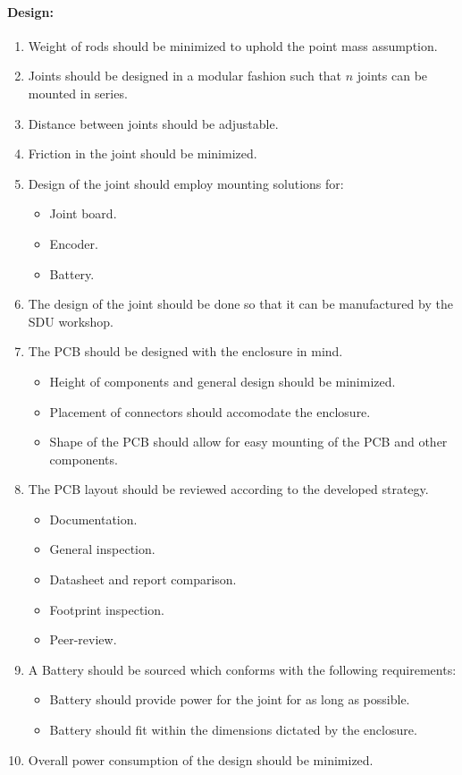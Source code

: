 \paragraph{Design:}
\begin{enumerate}[resume]
	\item Weight of rods should be minimized to uphold the point mass assumption.
	\label{enum:design_req1}
	\item Joints should be designed in a modular fashion such that $n$ joints can be mounted in series.
	\label{enum:design_req2}
	\item Distance between joints should be adjustable.
	\label{enum:design_req3}
	\item Friction in the joint should be minimized.
	\label{enum:design_req4}
	\item Design of the joint should employ mounting solutions for:
	\label{enum:design_req5}
	\begin{itemize}
		\item Joint board.
		\item Encoder.
		\item Battery. 
	\end{itemize}
	\item The design of the joint should be done so that it can be manufactured by the SDU workshop.
	\label{enum:design_req6}
	\item The PCB should be designed with the enclosure in mind.
	\label{enum:design_req7}
	\begin{itemize}
		\item Height of components and general design should be minimized.
		\item Placement of connectors should accomodate the enclosure.
		\item Shape of the PCB should allow for easy mounting of the PCB and other components.
	\end{itemize}
	\item The PCB layout should be reviewed according to the developed strategy.
	\label{enum:design_req8}
	\begin{itemize}
		\item Documentation.
		\item General inspection.
		\item Datasheet and report comparison.
		\item Footprint inspection.
		\item Peer-review.
	\end{itemize}
	\item A Battery should be sourced which conforms with the following requirements:
	\label{enum:design_req9}
	\begin{itemize}
		\item Battery should provide power for the joint for as long as possible.
		\item Battery should fit within the dimensions dictated by the enclosure.
	\end{itemize}
	\item Overall power consumption of the design should be minimized.
	\label{enum:overall_joint_power}
\end{enumerate}
